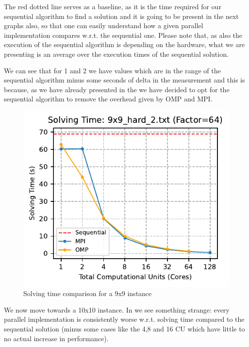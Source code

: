 The red dotted line serves as a baseline, as it is the time required for our sequential algorithm to find a solution and it is going to be present in the next graphs also, so that one can easily understand how a given parallel implementation compares w.r.t. the sequential one. Please note that, as also the execution of the sequential algorithm is depending on the hardware, what we are presenting is an average over the execution times of the sequential solution.


We can see that for 1 and 2 we have values which are in the range of the sequential algorithm minus some seconds of delta in the measurement and this is because, as we have already presented in the  we have decided to opt for the sequential algorithm to remove the overhead given by OMP and MPI.

\begin{figure}[htbp]
\centering
\includegraphics[width=0.9\linewidth]{imgs/solving_time_mpi_omp_9x9_hard_2.pdf}
\caption{Solving time comparison for a 9x9 instance}
\label{fig:comparison_solving_time_9x9}
\end{figure}

We now move towards a 10x10 instance. In  we see something strange: every parallel implementation is consistently worse w.r.t. solving time compared to the sequential solution (minus some cases like the 4,8 and 16 CU which have little to no actual increase in performance). 

